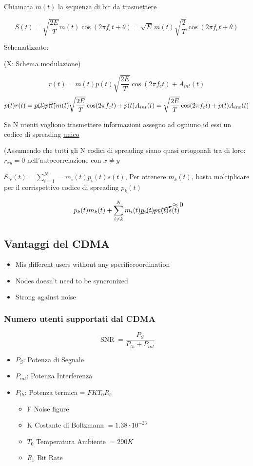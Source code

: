 \documentclass{article}
\DeclareMathOperator\snr{SNR}
\begin{document}
Chiamata $m(t)$ la sequenza di bit da trasmettere

\[S(t) = \sqrt{\frac{2E}{T}} m(t)\cos(2\pi f_c t + \theta) = \sqrt{E}\,m(t)\sqrt{\frac{2}{T}}\cos(2\pi f_c t + \theta)\]

Schematizzato:

(X: Schema modulazione)

\[r(t) = m(t)p(t)\sqrt{\frac{2E}{T}}\cos(2\pi f_c t) + A_{int}(t) \]
\[p(t)r(t) = \cancel{p(t) p(t)}m(t) \sqrt{\frac{2E}{T}}\cos(2\pi f_c t) + p(t)A_{int}(t)
= \sqrt{\frac{2E}{T}}\cos(2\pi f_c t) + p(t)A_{int}(t) \]

Se N utenti vogliono trasmettere informazioni assegno ad ogniuno id essi un codice di spreading \underline{unico}

(Assumendo che tutti gli N codici di spreading siano quasi ortogonali tra di loro: $r_{xy} = 0$ nell'autocorrelazione con $x \ne y$

\( S_N(t) = \sum^N_{i=1} = m_i(t)p_i(t)s(t)\), Per ottenere $m_k(t)$, basta moltiplicare per il corrispettivo codice di spreading $p_k(t)$

\[ p_k(t) m_k(t) + \sum^N_{i \neq k} m_i(t)\cancelto{\approx 0}{p_i(t)p_k(t)}s(t) \]

\subsection{Vantaggi del CDMA}
\begin{itemize}
    \item Mis different users without any specificcoordination
    \item Nodes doesn't need to be syncronized
    \item Strong against noise
\end{itemize}
\subsubsection{Numero utenti supportati dal CDMA}
\begin{minipage}{0.5\textwidth}
    \[ \snr = \frac{P_S}{P_{th} + P_{int}} \]
\end{minipage}
\begin{minipage}{0.5\textwidth}
    \begin{itemize}
        \item $P_S$: Potenza di Segnale
        \item $P_{int}$: Potenza Interferenza
        \item $P_{th}$: Potenza termica = $FKT_0R_b$
            \begin{itemize}
                \item F Noise figure
                \item K Costante di Boltzmann $= 1.38 \cdot 10^{-23}$
                \item $T_0$ Temperatura Ambiente $= 290K$
                \item $R_b$ Bit Rate
            \end{itemize}
    \end{itemize}
\end{minipage}
\end{document}
